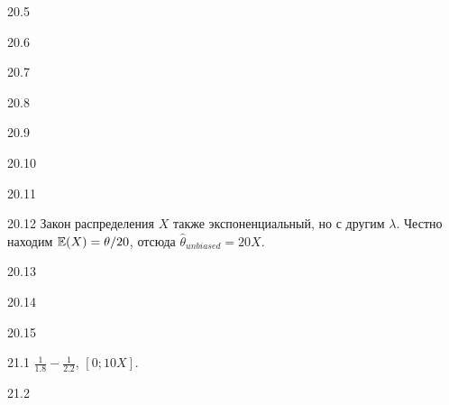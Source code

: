 \protect \hypertarget {soln:20.5}{}
\begin{solution}{{20.5}}

\end{solution}
\protect \hypertarget {soln:20.6}{}
\begin{solution}{{20.6}}

\end{solution}
\protect \hypertarget {soln:20.7}{}
\begin{solution}{{20.7}}

\end{solution}
\protect \hypertarget {soln:20.8}{}
\begin{solution}{{20.8}}

\end{solution}
\protect \hypertarget {soln:20.9}{}
\begin{solution}{{20.9}}

\end{solution}
\protect \hypertarget {soln:20.10}{}
\begin{solution}{{20.10}}

\end{solution}
\protect \hypertarget {soln:20.11}{}
\begin{solution}{{20.11}}

\end{solution}
\protect \hypertarget {soln:20.12}{}
\begin{solution}{{20.12}}
  Закон распределения $X$ также экспоненциальный, но с другим $\lambda$. Честно находим $\mathbb{E}(X)=\theta/20$, отсюда
  $\hat\theta_{unbiased} = 20X$.
\end{solution}
\protect \hypertarget {soln:20.13}{}
\begin{solution}{{20.13}}

\end{solution}
\protect \hypertarget {soln:20.14}{}
\begin{solution}{{20.14}}

\end{solution}
\protect \hypertarget {soln:20.15}{}
\begin{solution}{{20.15}}

\end{solution}
\protect \hypertarget {soln:21.1}{}
\begin{solution}{{21.1}}
  $\frac{1}{1.8} - \frac{1}{2.2}$, $[0;10X]$.
\end{solution}
\protect \hypertarget {soln:21.2}{}
\begin{solution}{{21.2}}
\end{solution}
